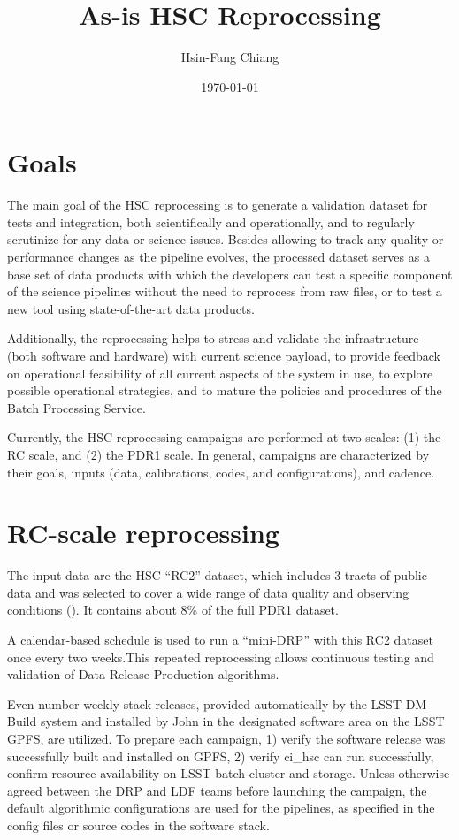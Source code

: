 \documentclass[DM,authoryear,toc]{lsstdoc}
\title{As-is HSC Reprocessing}
\author{%
Hsin-Fang Chiang
}
\date{\today}
\begin{document}
\maketitle

\section{Goals}

The main goal of the HSC reprocessing is to generate a validation
dataset for tests and integration, both scientifically and
operationally, and to regularly scrutinize for any data or science
issues.  Besides allowing to track any quality or performance changes
as the pipeline evolves, the processed dataset serves as a base set
of data products with which the developers can test a specific
component of the science pipelines without the need to reprocess
from raw files, or to test a new tool using state-of-the-art data
products.

Additionally, the reprocessing helps to stress and validate the
infrastructure (both software and hardware) with current science
payload, to provide feedback on operational feasibility of all
current aspects of the system in use, to explore possible operational
strategies, and to mature the policies and procedures of the Batch
Processing Service.

Currently, the HSC reprocessing campaigns are performed at two
scales: (1) the RC scale, and (2) the PDR1 scale. In general,
campaigns are characterized by their goals, inputs (data, calibrations,
codes, and configurations), and cadence.

\section{RC-scale reprocessing}

The input data are the HSC “RC2” dataset, which includes 3 tracts
of public data and was selected to cover a wide range of data quality
and observing conditions (). It contains about 8\% of the
full PDR1 dataset.

A calendar-based schedule is used to run a “mini-DRP” with this RC2
dataset once every two weeks.This repeated reprocessing allows
continuous testing and validation of Data Release Production
algorithms.

Even-number weekly stack releases, provided automatically by the
LSST DM Build system and installed by John in the designated software
area on the LSST GPFS, are utilized. To prepare each campaign, 1)
verify the software release was successfully built and installed
on GPFS, 2) verify ci\_hsc can run successfully, confirm resource
availability on LSST batch cluster and storage. Unless otherwise
agreed between the DRP and LDF teams before launching the campaign,
the default algorithmic configurations are used for the pipelines,
as specified in the config files or source codes in the software
stack.
\end{document}
